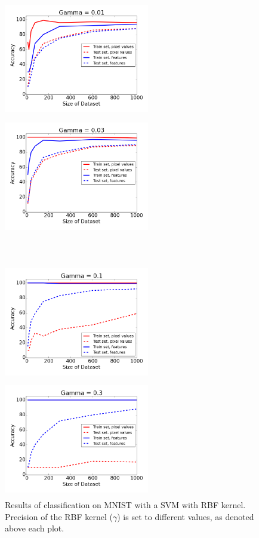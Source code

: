 \documentclass{article}
\begin{document}
\begin{figure}[htb]
\centering
\begin{minipage}{0.36\textwidth}
\includegraphics[height=2in,width=2.5in]{svm001.png}
\end{minipage}%
\centering
\begin{minipage}{0.36\textwidth}
\includegraphics[height=2in,width=2.5in]{svm003.png}
\end{minipage}\\
\centering
\begin{minipage}{0.36\textwidth}
\includegraphics[height=2in,width=2.5in]{svm01.png}
\end{minipage}%
\centering
\begin{minipage}{0.36\textwidth}
\includegraphics[height=2in,width=2.5in]{svm03.png}
\end{minipage}
\caption{Results of classification on MNIST with a SVM with RBF kernel. Precision of the RBF kernel ($\gamma$) is set to different values, as denoted above each plot.}
\end{figure}
\end{document}
